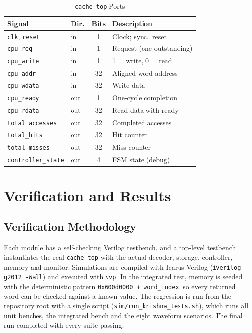 \documentclass[conference,a4paper]{IEEEtran}
\begin{document}
\begin{table}[!t]
\caption{\texttt{cache\_top} Ports}\label{tab:ports}
\centering
\renewcommand{\arraystretch}{1.05}
\footnotesize
\begin{tabular}{@{}llcp{3.0cm}@{}}
\toprule
\textbf{Signal} & \textbf{Dir.} & \textbf{Bits} & \textbf{Description}\\
\midrule
\texttt{clk}, \texttt{reset} & in & 1 & Clock; sync.\ reset\\
\texttt{cpu\_req} & in & 1 & Request (one outstanding)\\
\texttt{cpu\_write} & in & 1 & 1 = write, 0 = read\\
\texttt{cpu\_addr} & in & 32 & Aligned word address\\
\texttt{cpu\_wdata} & in & 32 & Write data\\
\texttt{cpu\_ready} & out & 1 & One-cycle completion\\
\texttt{cpu\_rdata} & out & 32 & Read data with ready\\
\texttt{total\_accesses} & out & 32 & Completed accesses\\
\texttt{total\_hits} & out & 32 & Hit counter\\
\texttt{total\_misses} & out & 32 & Miss counter\\
\texttt{controller\_state} & out & 4 & FSM state (debug)\\
\bottomrule
\end{tabular}
\end{table}

\section{Verification and Results}\label{sec:ver}
\subsection{Verification Methodology}\label{sec:meth}
Each module has a self-checking Verilog testbench, and a top-level testbench instantiates the real \texttt{cache\_top} with the actual decoder, storage, controller, memory and monitor. Simulations are compiled with Icarus Verilog \cite{icarus} (\texttt{iverilog -g2012 -Wall}) and executed with \texttt{vvp}. In the integrated test, memory is seeded with the deterministic pattern \texttt{0x600d0000 + word\_index}, so every returned word can be checked against a known value. The regression is run from the repository root with a single script (\texttt{sim/run\_krishna\_tests.sh}), which runs all unit benches, the integrated bench and the eight waveform scenarios. The final run completed with every suite passing.
\end{document}
